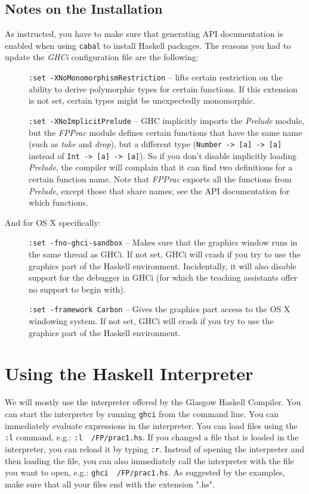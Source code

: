 \documentclass[]{article}
\begin{document}
\subsection{Notes on the Installation}
As instructed, you have to make sure that generating API documentation is enabled when using \texttt{cabal} to install Haskell packages.
The reasons you had to update the \emph{GHCi} configuration file are the following:
\begin{description}
  \item[] \texttt{:set -XNoMonomorphismRestriction} -- lifts certain restriction on the ability to derive polymorphic types for certain functions. 
  If this extension is not set, certain types might be unexpectedly monomorphic.
  \item[] \texttt{:set -XNoImplicitPrelude} -- GHC implicitly imports the \emph{Prelude} module, but the \emph{FPPrac} module defines certain functions that have the same name (such as \emph{take} and \emph{drop}), but a different type (\texttt{Number -> [a] -> [a]} instead of \texttt{Int -> [a] -> [a]}). 
  So if you don't disable implicitly loading \emph{Prelude}, the compiler will complain that it can find two definitions for a certain function name. 
  Note that \emph{FPPrac} exports all the functions from \emph{Prelude}, except those that share names; see the API documentation for which functions.
\end{description}
And for OS X specifically:
\begin{description}
  \item[] \texttt{:set -fno-ghci-sandbox} -- Makes sure that the graphics window runs in the same thread as GHCi. 
  If not set, GHCi will crash if you try to use the graphics part of the Haskell environment.
  Incidentally, it will also disable support for the debugger in GHCi (for which the teaching assistants offer no support to begin with).
  \item[] \texttt{:set -framework Carbon} -- Gives the graphics part access to the OS X windowing system.
  If not set, GHCi will crash if you try to use the graphics part of the Haskell environment.
\end{description}

\section{Using the Haskell Interpreter}
We will mostly use the interpreter offered by the Glasgow Haskell Compiler. You can start the interpreter by running \texttt{ghci} from the command line. 
You can immediately evaluate expressions in the interpreter. You can load files using the \texttt{:l} command, e.g.: \texttt{:l ~/FP/prac1.hs}.
If you changed a file that is loaded in the interpreter, you can reload it by typing \texttt{:r}.
Instead of opening the interpreter and then loading the file, you can also immediately call the interpreter with the file you want to open, e.g.: \texttt{ghci ~/FP/prac1.hs}.
As suggested by the examples, make sure that all your files end with the extension ".hs".
\end{document}
